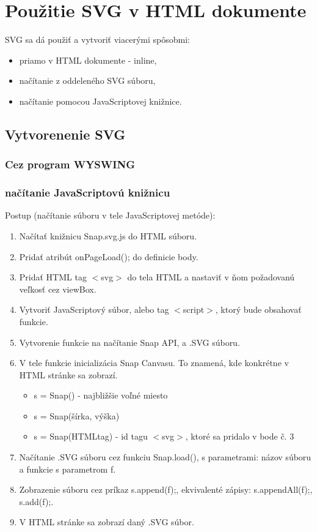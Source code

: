 \section{Použitie SVG v HTML dokumente}

SVG sa dá použiť a vytvoriť viacerými spôsobmi:
\begin{itemize}
	\item priamo v HTML dokumente - inline, 
	\item načítanie z oddeleného SVG súboru,
	\item načítanie pomocou JavaScriptovej knižnice.
\end{itemize}


 \subsection{Vytvorenenie SVG }
 
 \subsubsection{Cez program WYSWING}
 
 \subsubsection{načítanie JavaScriptovú knižnicu}

Postup (načítanie súboru v tele JavaScriptovej metóde): 
\begin{enumerate}
	\item Načítať knižnicu Snap.svg.js do HTML súboru. 
	\item Pridať atribút onPageLoad(); do definicie body.
	\item Pridať HTML tag $<$svg$>$ do tela HTML a nastaviť v ňom požadovanú veľkosť cez viewBox.
	\item Vytvoriť JavaScriptový súbor, alebo tag $<$script$>$, ktorý bude obsahovať funkcie. 
	\item Vytvorenie funkcie na načítanie Snap API, a .SVG súboru. 
	\item V tele funkcie inicializácia Snap Canvasu. To znamená, kde konkrétne v HTML stránke sa zobrazí.
	\begin{itemize}
		\item s = Snap() - najbližšie voľné miesto
		\item s = Snap(šírka, výška) 
		\item s = Snap(HTMLtag) - id tagu $<$svg$>$, ktoré sa pridalo v bode č. 3
	\end{itemize}
	\item Načítanie .SVG súboru cez funkciu Snap.load(), s parametrami: názov súboru a funkcie s parametrom f. 
	\item Zobrazenie súboru cez príkaz s.append(f);, ekvivalenté zápisy: s.appendAll(f);, s.add(f);. 
	\item V HTML stránke sa zobrazí daný .SVG súbor. 
	
	
\end{enumerate}

